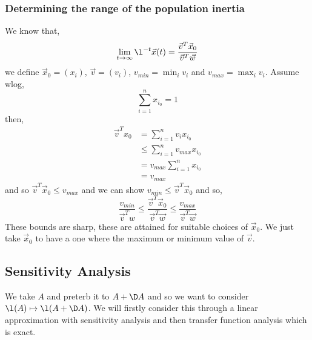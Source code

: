 \subsubsection{Determining the range of the population inertia}
We know that,
$$ \lim_{t \to \infty} \l^{-t}\vec x(t) = \frac{\vec v^T \vec x_0}{\vec v^T \vec w} $$
we define $\vec x_0 = (x_i)$, $\vec v = (v_i)$, $v_{min} = \min_{i}v_i$ and $v_{max} = \max_i v_i$. Assume wlog,
$$ \sum_{i=1}^n x_{i_0} = 1 $$
then,
\begin{align*}
  \vec v^T x_0 &= \sum_{i=1}^n v_ix_{i_0} \\
  &\le \sum_{i=1}^n v_{max}x_{i_0} \\
  &= v_{max}\sum_{i=1}^n x_{i_0}\\
  &= v_{max}
\end{align*}
and so $\vec v^T \vec x_0 \le v_{max}$ and we can show $v_{min} \le \vec v^T \vec x_0$ and so,
$$ \frac{v_{min}}{\vec v^T w} \le \frac{\vec v^T \vec x_0}{\vec v^T \vec w} \le \frac{v_{max}}{\vec v^T \vec w} $$
These bounds are sharp, these are attained for suitable choices of $\vec x_0$. We just take $\vec x_0$ to have a one where the maximum or minimum value of $\vec v$.

\subsection{Sensitivity Analysis}
We take $A$ and preterb it to $A + \D A$ and so we want to consider $\l(A) \mapsto \l(A + \D A)$. We will firstly consider this through a linear approximation with sensitivity analysis and then transfer function analysis which is exact.

